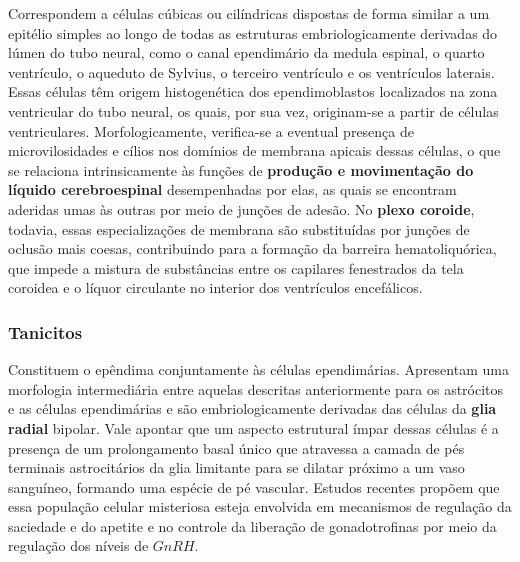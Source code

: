 \documentclass[
]{book}
\begin{document}
Correspondem a células cúbicas ou cilíndricas dispostas de forma similar a um epitélio simples ao longo de todas as estruturas embriologicamente derivadas do lúmen do tubo neural, como o canal ependimário da medula espinal, o quarto ventrículo, o aqueduto de Sylvius, o terceiro ventrículo e os ventrículos laterais. Essas células têm origem histogenética dos ependimoblastos localizados na zona ventricular do tubo neural, os quais, por sua vez, originam-se a partir de células ventriculares. Morfologicamente, verifica-se a eventual presença de microvilosidades e cílios nos domínios de membrana apicais dessas células, o que se relaciona intrinsicamente às funções de \textbf{produção e movimentação do líquido cerebroespinal} desempenhadas por elas, as quais se encontram aderidas umas às outras por meio de junções de adesão. No \textbf{plexo coroide}, todavia, essas especializações de membrana são substituídas por junções de oclusão mais coesas, contribuindo para a formação da barreira hematoliquórica, que impede a mistura de substâncias entre os capilares fenestrados da tela coroidea e o líquor circulante no interior dos ventrículos encefálicos.

\hypertarget{tanicitos}{%
\subsubsection*{Tanicitos}\label{tanicitos}}

Constituem o epêndima conjuntamente às células ependimárias. Apresentam uma morfologia intermediária entre aquelas descritas anteriormente para os astrócitos e as células ependimárias e são embriologicamente derivadas das células da \textbf{glia radial} bipolar. Vale apontar que um aspecto estrutural ímpar dessas células é a presença de um prolongamento basal único que atravessa a camada de pés terminais astrocitários da glia limitante para se dilatar próximo a um vaso sanguíneo, formando uma espécie de pé vascular. Estudos recentes propõem que essa população celular misteriosa esteja envolvida em mecanismos de regulação da saciedade e do apetite e no controle da liberação de gonadotrofinas por meio da regulação dos níveis de \(GnRH\).
\end{document}
